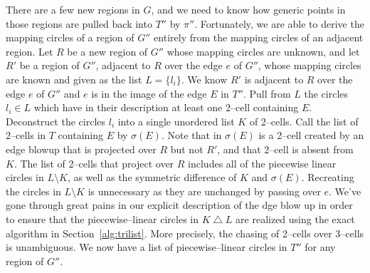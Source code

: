 There are a few new regions in $G$, and we need to know how generic points in those regions are pulled back into $T''$ by $\pi''$.
Fortunately, we are able to derive the mapping circles of a region of $G''$ entirely from the mapping circles of an adjacent region.
Let $R$ be a new region of $G''$ whose mapping circles are unknown, and let $R'$ be a region of $G''$, adjacent to $R$ over the edge $e$ of $G''$, whose mapping circles are known and given as the list $L=\{l_i\}$.
We know $R'$ is adjacent to $R$ over the edge $e$ of $G''$ and $e$ is in the image of the edge $E$ in $T''$.
Pull from $L$ the circles $l_i\in L$ which have in their description at least one 2--cell containing $E$.
Deconstruct the circles $l_i$ into a single unordered list $K$ of 2--cells.
Call the list of 2--cells in $T$ containing $E$ by $\sigma(E)$.
Note that in $\sigma(E)$ is a 2--cell created by an edge blowup that is projected over $R$ but not $R'$, and that 2--cell is absent from $K$.
The list of 2--cells that project over $R$ includes all of the piecewise linear circles in $L\setminus K$, as well as the symmetric difference of $K$ and $\sigma(E)$.
Recreating the circles in $L\setminus K$ is unnecessary as they are unchanged by passing over $e$.
We've gone through great pains in our explicit description of the dge blow up in order to ensure that the piecewise--linear circles in $K\bigtriangleup L$ are realized using the exact algorithm in Section~\ref{alg:trilist}.
More precisely, the chasing of 2--cells over 3--cells is unambiguous.
We now have a list of piecewise--linear circles in $T''$ for any region of $G''$.






